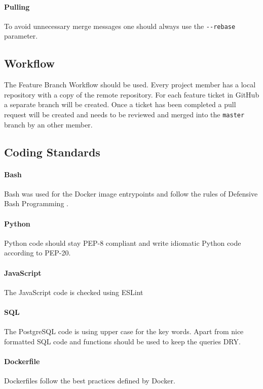 \paragraph{Pulling}
To avoid unnecessary merge messages one should always use the
\texttt{-\/-rebase} parameter.

\subsection{Workflow}\label{git-workflow}
The Feature Branch Workflow\cite{pm_9_atlassian_git_tutorial_2015} should be used. Every project member has a local repository with a copy of the remote
repository. For each feature ticket in GitHub a separate branch
will be created. Once a ticket has been completed a pull request will be
created and needs to be reviewed and merged into the \texttt{master} branch by an other member.

\subsection{Coding Standards}

\paragraph{Bash} Bash was used for the Docker image entrypoints and follow
the rules of Defensive Bash Programming \cite{pm_10_lavi_2012}.

\paragraph{Python} Python code should stay PEP-8\cite{pm_11_python.org_2015} compliant and write idiomatic Python code according to PEP-20\cite{pm_12_python.org_2015}.

\paragraph{JavaScript} The JavaScript code is checked using ESLint\cite{pm_13_eslint.org_2015}

\paragraph{SQL} The PostgreSQL code is using upper case for the key words. Apart from nice formatted SQL code and functions should be used
to keep the queries DRY\cite{pm_14_wikipedia_2015}.

\paragraph{Dockerfile} Dockerfiles follow the best practices\cite{pm_15_docs.docker.com_2015} defined by Docker.
